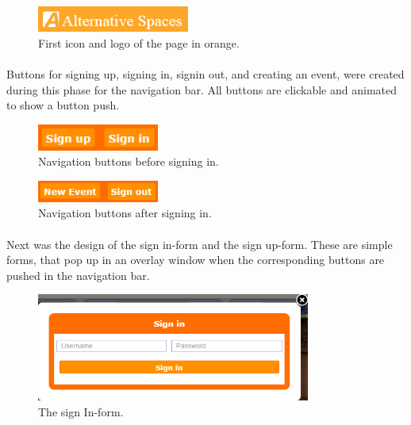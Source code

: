 \begin{figure}[ht!]
\centering
\includegraphics[width=50mm]{img/Sprint2-logo1.png}
\caption{First icon and logo of the page in orange. \label{overflow}}
\end{figure}

\paragraph{} Buttons for signing up, signing in, signin out, and creating an event, were created during this phase for the navigation bar. All buttons are clickable and animated to show a button push. \\

\begin{figure}[ht!]
\centering
\includegraphics[width=40mm]{img/Sprint2-buttons1.png}
\caption{Navigation buttons before signing in. \label{overflow}}
\end{figure}

\begin{figure}[ht!]
\centering
\includegraphics[width=40mm]{img/Sprint2-buttons2.png}
\caption{Navigation buttons after signing in. \label{overflow}}
\end{figure}

\paragraph{}
Next was the design of the sign in-form and the sign up-form. These are simple forms, that pop up in an overlay window when the corresponding buttons are pushed in the navigation bar. \\

\begin{figure}[ht!]
\centering
\includegraphics[width=90mm]{img/Sprint2-SignInForm.png}
\caption{The sign In-form. \label{overflow}}
\end{figure}

